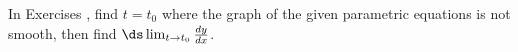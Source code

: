 {\noindent In Exercises}
{, find $t=t_0$ where the graph of the given parametric equations is not smooth, then find $\ds \lim_{t\to t_0}\frac{dy}{dx}$.
}
